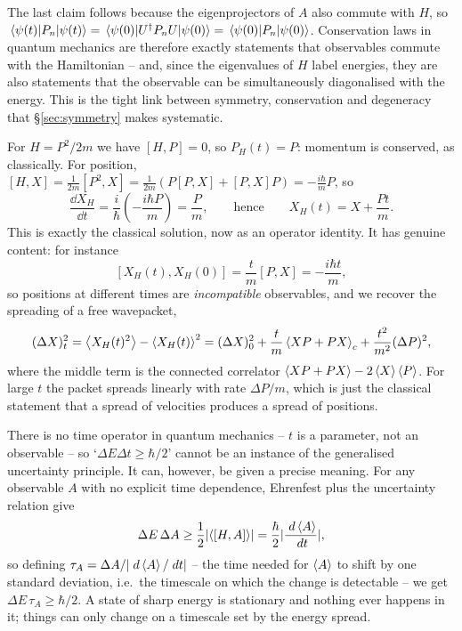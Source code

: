 \documentclass[a4paper]{scrartcl}
\begin{document}
The last claim follows because the eigenprojectors of $A$ also commute with $H$, so $\mel{\psi(t)}{P_n}{\psi(t)} = \mel{\psi(0)}{U^\dagger P_n U}{\psi(0)} = \mel{\psi(0)}{P_n}{\psi(0)}$. Conservation laws in quantum mechanics are therefore exactly statements that observables commute with the Hamiltonian -- and, since the eigenvalues of $H$ label energies, they are also statements that the observable can be simultaneously diagonalised with the energy. This is the tight link between symmetry, conservation and degeneracy that \S\ref{sec:symmetry} makes systematic.

\begin{example}
    For $H = P^2/2m$ we have $[H,P] = 0$, so $P_H(t) = P$: momentum is conserved, as classically. For position, $[H, X] = \frac{1}{2m}[P^2, X] = \frac{1}{2m}\left(P[P,X] + [P,X]P\right) = -\frac{i\hbar}{m}P$, so
    $$
    \frac{\dd X_H}{\dd t} = \frac{i}{\hbar}\left(-\frac{i\hbar P}{m}\right) = \frac{P}{m}, \qquad \text{hence} \qquad X_H(t) = X + \frac{P t}{m}.
    $$
    This is exactly the classical solution, now as an operator identity. It has genuine content: for instance
    $$
    [X_H(t), X_H(0)] = \frac{t}{m}[P, X] = -\frac{i\hbar t}{m},
    $$
    so positions at different times are \emph{incompatible} observables, and we recover the spreading of a free wavepacket,
    $$
    (\Delta X)_t^2 = \expval{X_H(t)^2} - \expval{X_H(t)}^2 = (\Delta X)_0^2 + \frac{t}{m}\expval{XP + PX}_c + \frac{t^2}{m^2}(\Delta P)^2,
    $$
    where the middle term is the connected correlator $\expval{XP+PX} - 2\expval{X}\expval{P}$. For large $t$ the packet spreads linearly with rate $\Delta P/m$, which is just the classical statement that a spread of velocities produces a spread of positions.
\end{example}

\begin{remark}
    There is no time operator in quantum mechanics -- $t$ is a parameter, not an observable -- so `$\Delta E \Delta t \geq \hbar/2$' cannot be an instance of the generalised uncertainty principle. It can, however, be given a precise meaning. For any observable $A$ with no explicit time dependence, Ehrenfest plus the uncertainty relation give
    $$
    \Delta E \, \Delta A \geq \frac{1}{2}\lvert\expval{[H,A]}\rvert = \frac{\hbar}{2}\lvert\frac{\; d \expval{A}}{\; d t}\rvert,
    $$
    so defining $\tau_A = \Delta A / \lvert\; d\expval{A}/\; d t\rvert$ -- the time needed for $\expval{A}$ to shift by one standard deviation, i.e.\ the timescale on which the change is detectable -- we get $\Delta E \, \tau_A \geq \hbar/2$. A state of sharp energy is stationary and nothing ever happens in it; things can only change on a timescale set by the energy spread.
\end{remark}
\end{document}
